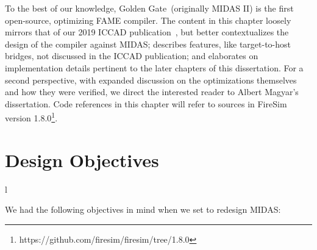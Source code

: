To the best of our knowledge, Golden Gate~(originally MIDAS II) is the first
open-source, optimizing FAME compiler. The content in this chapter loosely
mirrors that of our 2019 ICCAD publication~\cite{GoldenGate}, but better
contextualizes the design of the compiler against MIDAS; describes features,
like target-to-host bridges, not discussed in the ICCAD publication; and
elaborates on implementation details pertinent to the later chapters of this
dissertation.  For a second perspective, with expanded discussion on the
optimizations themselves and how they were verified, we direct the interested
reader to Albert Magyar's dissertation. Code references in this chapter will
refer to sources in FireSim version
1.8.0\footnote{https://github.com/firesim/firesim/tree/1.8.0}.

\section{Design Objectives}\label{sec:gg-design-objectives}l

We had the following objectives in mind when we set to redesign MIDAS:

